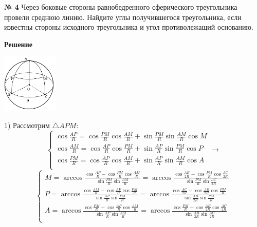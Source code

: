     \textbf{№ 4}
    Через боковые стороны равнобедренного сферического треугольника провели среднюю линию.
    Найдите углы получившегося треугольника, если известны стороны исходного треугольника и угол противолежащий основанию.

    \textbf{Решение}\\

    \begin{center}
        \includegraphics[width=0.2\textwidth]{images/img6}\\
    \end{center}

    1) Рассмотрим $\triangle APM$:
    \[
        \begin{cases}
            \cos \frac{AP}{R} = \cos \frac{PM}{R}\cos\frac{AM}{R} + \sin \frac{PM}{R}\sin\frac{AM}{R}\cos M\\
            \cos \frac{AM}{R} = \cos \frac{AP}{R}\cos\frac{PM}{R} + \sin \frac{AP}{R}\sin\frac{PM}{R}\cos P\\
            \cos \frac{PM}{R} = \cos \frac{AP}{R}\cos\frac{AM}{R} + \sin \frac{AP}{R}\sin\frac{AM}{R}\cos A\\
        \end{cases}
        \rightarrow
    \]
    \[
        \begin{cases}
            M = \arccos \frac{\cos \frac{AP}{R} - \cos \frac{PM}{R}\cos\frac{AM}{R}}{\sin \frac{PM}{R}\sin\frac{AM}{R}}=
            \arccos \frac{\cos \frac{AB}{2R} - \cos \frac{PM}{R}\cos\frac{AC}{2R}}{\sin \frac{PM}{R}\sin\frac{AC}{2R}}\\
            P = \arccos \frac{\cos \frac{AM}{R} -  \cos \frac{AP}{R}\cos\frac{PM}{R}}{\sin \frac{AP}{R}\sin\frac{PM}{R}}=
            \arccos \frac{\cos \frac{AC}{2R} -  \cos \frac{AB}{2R}\cos\frac{PM}{R}}{\sin \frac{AB}{2R}\sin\frac{PM}{R}}\\
            A = \arccos \frac{\cos \frac{PM}{R} - \cos \frac{AP}{R}\cos\frac{AM}{R}}{\sin \frac{AP}{R}\sin\frac{AM}{R}}=
            \arccos \frac{\cos \frac{PM}{R} - \cos \frac{AB}{2R}\cos\frac{AC}{2R}}{\sin \frac{AB}{2R}\sin\frac{AC}{2R}}\\
        \end{cases}
    \]

